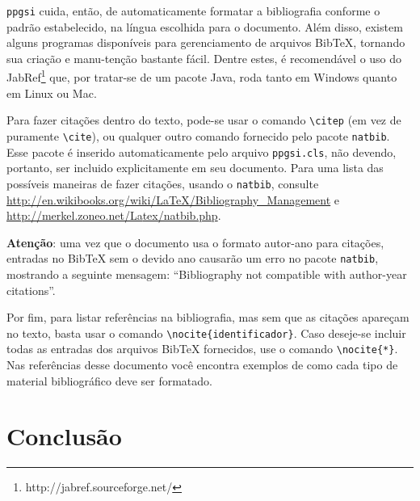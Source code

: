 \documentclass[12pt,a4paper,utf8]{ppgsi}
\newcommand{\BibTeX}{{\sc Bib}\TeX} %
\begin{document}
	\verb|ppgsi| cuida, então, de automaticamente formatar a bibliografia conforme o padrão estabelecido, na língua escolhida para o documento. Além disso, existem alguns programas disponíveis para gerenciamento de arquivos \BibTeX{}, tornando sua criação e manu-tenção bastante fácil. Dentre estes, é recomendável o uso do JabRef\footnote{http://jabref.sourceforge.net/} que, por tratar-se de um pacote Java, roda tanto em Windows quanto em Linux ou Mac.
	
	Para fazer citações dentro do texto, pode-se usar o comando \verb|\citep| (em vez de puramente \verb|\cite|), ou qualquer outro comando fornecido pelo pacote \verb|natbib|. Esse pacote é inserido automaticamente pelo arquivo \verb|ppgsi.cls|, não devendo, portanto, ser incluido explicitamente em seu documento. Para uma lista das possíveis maneiras de fazer citações, usando o \verb|natbib|, consulte \url{http://en.wikibooks.org/wiki/LaTeX/Bibliography_Management} e \url{http://merkel.zoneo.net/La}\linebreak\url{tex/natbib.php}.
	
	\textbf{Atenção}: uma vez que o documento usa o formato autor-ano para citações, entradas no \BibTeX{} sem o devido ano causarão um erro no pacote \verb|natbib|, mostrando a seguinte mensagem: ``Bibliography not compatible with author-year citations''.
	
	Por fim, para listar referências na bibliografia, mas sem que as citações apareçam no texto, basta usar o comando \verb|\nocite{identificador}|. Caso deseje-se incluir todas as entradas dos arquivos \BibTeX{} fornecidos, use o comando \verb|\nocite{*}|. Nas referências desse documento você encontra exemplos de como cada tipo de material bibliográfico deve ser formatado.	
	

    
    \nocite{fichaIntel} 
    
    \nocite{fichaIntelISA}
    
    \nocite{icunicamp}
    
    \nocite{aulaUFRJ}
    
    \nocite{hyperthreading}
    
    \nocite{histIntel}
    
    \nocite{compare}
    
    \nocite{articleSC}
        
\section{Conclusão}
\end{document}
